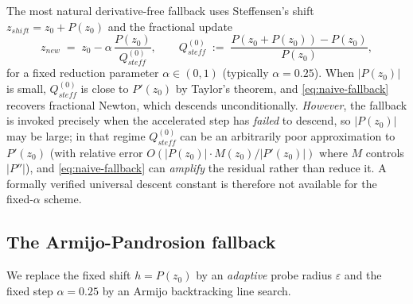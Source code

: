 \documentclass[11pt,a4paper]{article}
\begin{document}
The most natural derivative-free fallback uses Steffensen's shift $z_{shift} = z_0 + P(z_0)$ and the fractional update
\begin{equation}
z_{new} \;=\; z_0 - \alpha \, \frac{P(z_0)}{Q_{steff}^{(0)}}, \qquad Q_{steff}^{(0)} \;:=\; \frac{P(z_0 + P(z_0)) - P(z_0)}{P(z_0)}, \label{eq:naive-fallback}
\end{equation}
for a fixed reduction parameter $\alpha \in (0, 1)$ (typically $\alpha = 0.25$). When $|P(z_0)|$ is small, $Q_{steff}^{(0)}$ is close to $P'(z_0)$ by Taylor's theorem, and \eqref{eq:naive-fallback} recovers fractional Newton, which descends unconditionally. \emph{However}, the fallback is invoked precisely when the accelerated step has \emph{failed} to descend, so $|P(z_0)|$ may be large; in that regime $Q_{steff}^{(0)}$ can be an arbitrarily poor approximation to $P'(z_0)$ (with relative error $O(|P(z_0)| \cdot M(z_0)/|P'(z_0)|)$ where $M$ controls $|P''|$), and \eqref{eq:naive-fallback} can \emph{amplify} the residual rather than reduce it. A formally verified universal descent constant is therefore not available for the fixed-$\alpha$ scheme.

\subsection{The Armijo-Pandrosion fallback}

We replace the fixed shift $h = P(z_0)$ by an \emph{adaptive} probe radius $\varepsilon$ and the fixed step $\alpha = 0.25$ by an Armijo backtracking line search.
\end{document}
